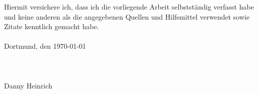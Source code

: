 \cleardoublepage
\normalsize
Hiermit versichere ich, dass ich die vorliegende Arbeit selbstständig verfasst habe und keine anderen als die angegebenen Quellen und Hilfsmittel verwendet sowie Zitate kenntlich gemacht habe.\\\\
Dortmund, den \today \\\\\\\\
Danny Heinrich
